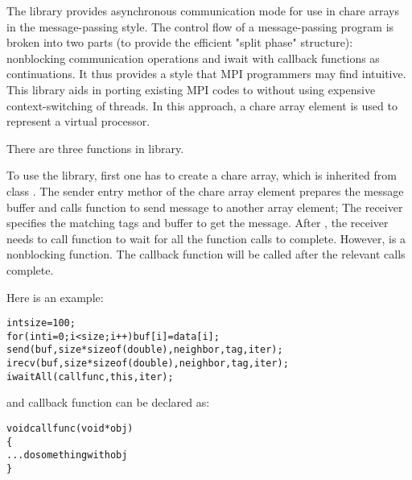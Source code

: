 The \irecv{} library provides asynchronous communication mode for 
use in chare arrays in the message-passing style. The control flow of a 
message-passing program is broken into two parts (to provide the efficient 
"split phase" structure): nonblocking communication operations and 
iwait with callback functions as continuations. It thus provides a style 
that MPI programmers may find intuitive. This library aids in porting
existing MPI codes to \charmpp{} without using expensive context-switching 
of threads. In this approach, a chare array element is used to
represent a virtual processor. 

There are three functions in \irecv{} library.

  


To use the \irecv{} library, first one has to create a chare array, which 
is inherited from class . The sender entry methor of the
chare array element prepares the message buffer and calls  function 
to send message to another array element; The receiver specifies the 
matching tags and buffer to get the message. After , the receiver 
needs to call  function to wait for all the  function 
calls to complete. However,  is a nonblocking function. 
The callback function will be called after the relevant  calls 
complete.

Here is an example:

\begin{alltt}
     int size = 100;
     for (int i=0; i<size; i++) buf[i] = data[i];
     send(buf, size*sizeof(double), neighbor, tag, iter);
     irecv(buf, size*sizeof(double), neighbor, tag, iter);
     iwaitAll(callfunc, this, iter);
\end{alltt}

and callback function can be declared as:

\begin{alltt}
     void callfunc(void *obj)
     \{
       ... do something with obj
     \}
\end{alltt}
